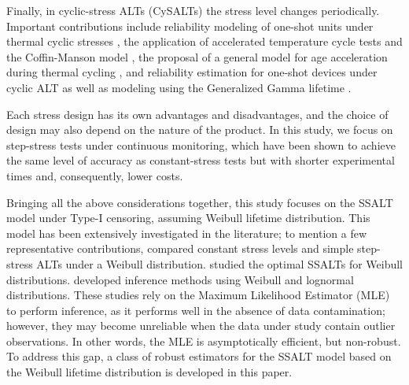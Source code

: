 \documentclass{article}
\begin{document}
Finally, in cyclic-stress ALTs (CySALTs) the stress level changes periodically. Important contributions include reliability modeling of one-shot units under thermal cyclic stresses \cite{cheng2017}, the application of accelerated temperature cycle tests and the Coffin-Manson model \cite{cui2005}, the proposal of a general model for age acceleration during thermal cycling \cite{nachlas1986}, and reliability estimation for one-shot devices under cyclic ALT as well as modeling using the Generalized Gamma lifetime \cite{zhu2021, zhu2022}.


%
Each stress design has its own advantages and disadvantages, and the choice of design may also depend on the nature of the product. In this study, we focus on step-stress tests under continuous monitoring, which have been shown to achieve the same level of accuracy as constant-stress tests but with shorter experimental times and, consequently, lower costs.

Bringing all the above considerations together, this study focuses on the SSALT model under Type-I censoring, assuming Weibull lifetime distribution. This model has been extensively investigated in the literature; to mention a few representative contributions, \cite{khamis1997} compared constant stress levels and simple step-stress ALTs under a Weibull distribution. \cite{bai1993} studied the optimal SSALTs for Weibull distributions. \cite{zhao2005} developed inference methods using Weibull and lognormal distributions.  These studies rely on the Maximum Likelihood Estimator (MLE) to perform inference, as it performs well in the absence of data contamination; however, they may become unreliable when the data under study contain outlier observations. In other words, the MLE is asymptotically efficient, but non-robust. To address this gap, a class of robust estimators for the SSALT model based on the Weibull lifetime distribution is developed in this paper.
\end{document}
